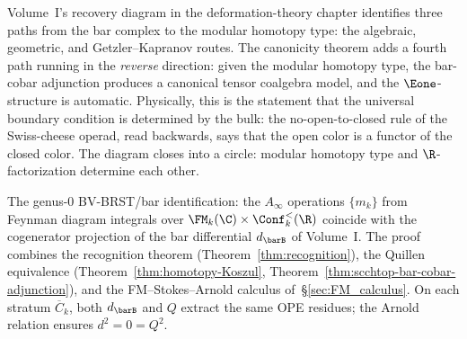 \begin{remark}
\label{rem:boundary-path}
Volume~I's recovery diagram in the deformation-theory chapter identifies three
paths from the bar complex to the modular homotopy type:
the algebraic, geometric, and Getzler--Kapranov routes.
The canonicity theorem adds a fourth path running in the
\emph{reverse} direction: given the modular homotopy type,
the bar-cobar adjunction produces a canonical tensor
coalgebra model, and the $\Eone$-structure is automatic.
Physically, this is the statement that the universal
boundary condition is determined by the bulk: the
no-open-to-closed rule of the Swiss-cheese operad, read
backwards, says that the open color is a functor of
the closed color. The diagram closes into a circle:
modular homotopy type and $\R$-factorization determine
each other.
\end{remark}

\begin{remark}
\label{rem:mc5-bridge-pointer}%
\label{rem:mc5-genus-zero-bridge}%
The genus-$0$ BV-BRST/bar
identification: the $A_\infty$ operations $\{m_k\}$ from Feynman
diagram integrals over $\FM_k(\C) \times \Conf_k^{<}(\R)$
coincide with the cogenerator projection of the bar differential
$d_{\barB}$ of Volume~I. The proof combines the recognition
theorem (Theorem~\ref{thm:recognition}), the Quillen equivalence
(Theorem~\ref{thm:homotopy-Koszul},
Theorem~\ref{thm:scchtop-bar-cobar-adjunction}), and the FM--Stokes--Arnold
calculus of~\S\ref{sec:FM_calculus}. On each stratum
$\overline{C}_k$, both $d_{\barB}$ and $Q$ extract the same
OPE residues; the Arnold relation ensures $d^2 = 0 = Q^2$.
\end{remark}

